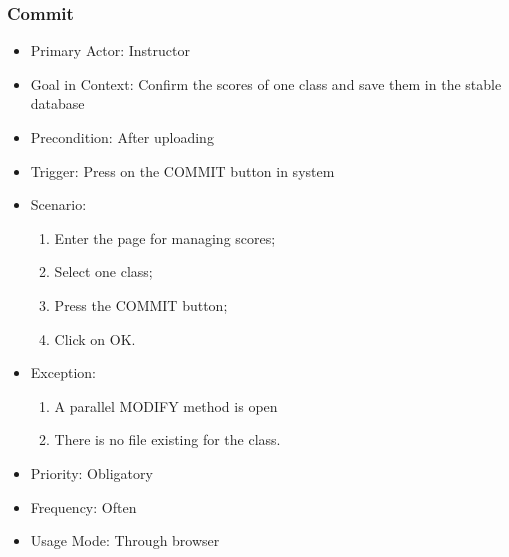 \documentclass[a4]{article}
\begin{document}
\subsubsection{Commit}
\begin{itemize}
\item Primary Actor: Instructor
\item Goal in Context: Confirm the scores of one class and save them in the stable database
\item Precondition: After uploading
\item Trigger: Press on the COMMIT button in system
\item Scenario: 
\begin{enumerate}
\item Enter the page for managing scores;
\item Select one class;
\item Press the COMMIT button;
\item Click on OK.
\end{enumerate}
\item Exception:
\begin{enumerate}
\item A parallel MODIFY method is open
\item There is no file existing for the class.
\end{enumerate}
\item Priority: Obligatory
\item Frequency: Often
\item Usage Mode: Through browser
\end{itemize}
\end{document}
